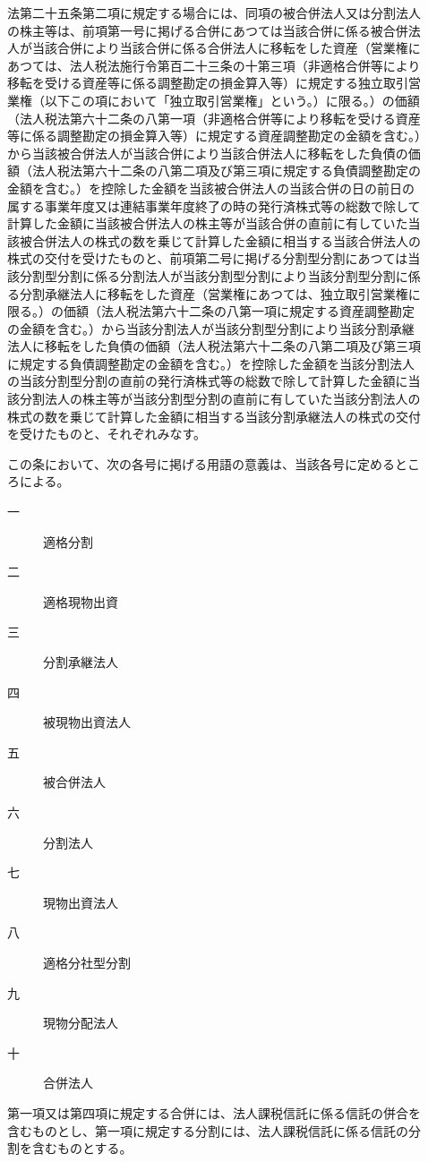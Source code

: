 \documentclass[twocolumn,a4j,10pt]{ltjtarticle}
\begin{document}
\begin{description}
\item[]法第二十五条第二項に規定する場合には、同項の被合併法人又は分割法人の株主等は、前項第一号に掲げる合併にあつては当該合併に係る被合併法人が当該合併により当該合併に係る合併法人に移転をした資産（営業権にあつては、法人税法施行令第百二十三条の十第三項（非適格合併等により移転を受ける資産等に係る調整勘定の損金算入等）に規定する独立取引営業権（以下この項において「独立取引営業権」という。）に限る。）の価額（法人税法第六十二条の八第一項（非適格合併等により移転を受ける資産等に係る調整勘定の損金算入等）に規定する資産調整勘定の金額を含む。）から当該被合併法人が当該合併により当該合併法人に移転をした負債の価額（法人税法第六十二条の八第二項及び第三項に規定する負債調整勘定の金額を含む。）を控除した金額を当該被合併法人の当該合併の日の前日の属する事業年度又は連結事業年度終了の時の発行済株式等の総数で除して計算した金額に当該被合併法人の株主等が当該合併の直前に有していた当該被合併法人の株式の数を乗じて計算した金額に相当する当該合併法人の株式の交付を受けたものと、前項第二号に掲げる分割型分割にあつては当該分割型分割に係る分割法人が当該分割型分割により当該分割型分割に係る分割承継法人に移転をした資産（営業権にあつては、独立取引営業権に限る。）の価額（法人税法第六十二条の八第一項に規定する資産調整勘定の金額を含む。）から当該分割法人が当該分割型分割により当該分割承継法人に移転をした負債の価額（法人税法第六十二条の八第二項及び第三項に規定する負債調整勘定の金額を含む。）を控除した金額を当該分割法人の当該分割型分割の直前の発行済株式等の総数で除して計算した金額に当該分割法人の株主等が当該分割型分割の直前に有していた当該分割法人の株式の数を乗じて計算した金額に相当する当該分割承継法人の株式の交付を受けたものと、それぞれみなす。
\item[]この条において、次の各号に掲げる用語の意義は、当該各号に定めるところによる。
\begin{description}
\item[一]適格分割
\item[二]適格現物出資
\item[三]分割承継法人
\item[四]被現物出資法人
\item[五]被合併法人
\item[六]分割法人
\item[七]現物出資法人
\item[八]適格分社型分割
\item[九]現物分配法人
\item[十]合併法人
\end{description}
\item[]第一項又は第四項に規定する合併には、法人課税信託に係る信託の併合を含むものとし、第一項に規定する分割には、法人課税信託に係る信託の分割を含むものとする。
\end{description}
\end{document}
